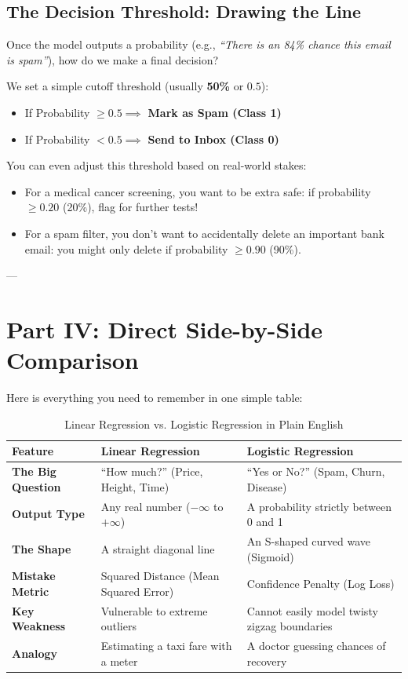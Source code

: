 \documentclass[11pt,journal,onecolumn]{IEEEtran}
\begin{document}
\subsection{The Decision Threshold: Drawing the Line}
Once the model outputs a probability (e.g., \textit{``There is an 84\% chance this email is spam''}), how do we make a final decision?

We set a simple cutoff threshold (usually \textbf{50\%} or $0.5$):
\begin{itemize}
    \item If Probability $\geq 0.5 \implies$ \textbf{Mark as Spam (Class 1)}
    \item If Probability $< 0.5 \implies$ \textbf{Send to Inbox (Class 0)}
\end{itemize}

You can even adjust this threshold based on real-world stakes:
\begin{itemize}
    \item For a medical cancer screening, you want to be extra safe: if probability $\geq 0.20$ (20\%), flag for further tests!
    \item For a spam filter, you don't want to accidentally delete an important bank email: you might only delete if probability $\geq 0.90$ (90\%).
\end{itemize}

---

\section{Part IV: Direct Side-by-Side Comparison}

Here is everything you need to remember in one simple table:

\begin{table}[htbp]
\centering
\caption{Linear Regression vs. Logistic Regression in Plain English}
\label{tab:beginner_comparison}
\begin{tabular}{@{}lll@{}}
\toprule
\textbf{Feature} & \textbf{Linear Regression} & \textbf{Logistic Regression} \\
\midrule
\textbf{The Big Question} & ``How much?'' (Price, Height, Time) & ``Yes or No?'' (Spam, Churn, Disease) \\
\textbf{Output Type} & Any real number ($-\infty$ to $+\infty$) & A probability strictly between 0 and 1 \\
\textbf{The Shape} & A straight diagonal line & An S-shaped curved wave (Sigmoid) \\
\textbf{Mistake Metric} & Squared Distance (Mean Squared Error) & Confidence Penalty (Log Loss) \\
\textbf{Key Weakness} & Vulnerable to extreme outliers & Cannot easily model twisty zigzag boundaries \\
\textbf{Analogy} & Estimating a taxi fare with a meter & A doctor guessing chances of recovery \\
\bottomrule
\end{tabular}
\end{table}
\end{document}
